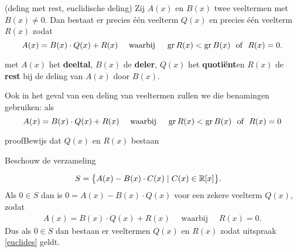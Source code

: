 \documentclass{ximera}
\begin{document}
\begin{theorem}(deling met rest, euclidische deling)
Zij $A(x)$ en $B(x)$ twee veeltermen met $B(x) \neq 0$. Dan bestaat er precies één veelterm $Q(x)$ en precies één veelterm $R(x)$ zodat
\begin{equation} \label{euclides}
A(x) = B(x)\cdot Q(x) + R(x) \quad \text{ waarbij } \quad \operatorname{gr} R(x) < \operatorname{gr} B(x) \,\, \text{ of } \,\, R(x) = 0.
\end{equation}

met $A(x)$ het \textbf{deeltal}, $B(x)$ de \textbf{deler}, $Q(x)$ het \textbf{quotiënt}en $R(x)$ de \textbf{rest} bij de deling van $A(x)$ door $B(x)$. 
\end{theorem} 
\begin{Uitbreiding}



Ook in het geval van een deling van veeltermen zullen we die benamingen gebruiken: als
\[
A(x) = B(x)\cdot Q(x) + R(x) \quad \text{ waarbij } \quad \operatorname{gr} R(x) < \operatorname{gr} B(x) \,\, \text{ of } \,\, R(x) = 0
\]

	






	
\begin{expandable}{proof}{Bewijs dat $Q(x)$ en $R(x)$ bestaan}
	
Beschouw de verzameling 

\begin{align*}
S & = \bigl\{ A(x) - B(x)\cdot C(x) \mid C(x) \in \mathbb{R}[x] \bigr\}.  
\end{align*}
Als $0 \in S$ dan is $0 = A(x) - B(x)\cdot Q(x)$ voor een zekere veelterm $Q(x)$, zodat \begin{align*}
A(x) = B(x)\cdot Q(x) + R(x) \quad \text{ waarbij } \quad R(x) = 0.
\end{align*}
Dus als $0 \in S$ dan bestaan er veeltermen $Q(x)$ en $R(x)$ zodat uitspraak \eqref{euclides} geldt. 


\end{expandable}
\end{Uitbreiding}
\end{document}
